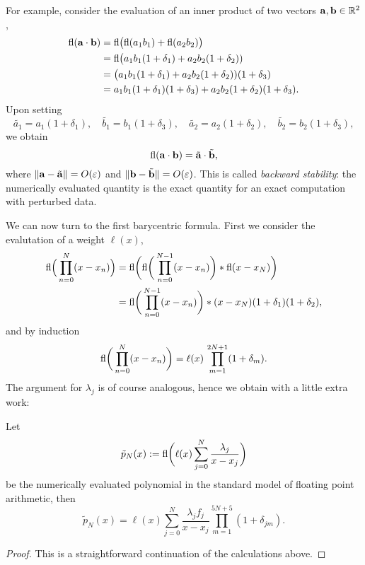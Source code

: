 For example, consider the evaluation of an inner product of two vectors 
${\bf a}, {\bf b} \in \mathbb{R}^2$, 
\begin{align*}
   {\rm fl}({\bf a} \cdot {\bf b})
   &= {\rm fl}\big( {\rm fl}(a_1 b_1) + {\rm fl}(a_2b_2)\big) \\ 
   &= {\rm fl}\big( a_1 b_1 (1+\delta_1) + a_2b_2 (1+\delta_2)) \\ 
   &= \big( a_1 b_1 (1+\delta_1) + a_2b_2 (1+\delta_2))(1+\delta_3) \\ 
   &= a_1 b_1 (1+\delta_1)(1+\delta_3)
      + a_2b_2 (1+\delta_2)(1+\delta_3).
\end{align*}
Upon setting 
\[
   \tilde{a_1} = a_1 (1+\delta_1), \quad 
   \tilde{b_1} = b_1 (1+\delta_3), \quad 
   \tilde{a_2} = a_2 (1+\delta_2), \quad 
   \tilde{b_2} = b_2 (1+\delta_3),
\]
we obtain 
\[
   {\rm fl}({\bf a} \cdot {\bf b}) = \tilde{\bf a} \cdot \tilde{\bf b},
\]
where $\|{\bf a} - \tilde{\bf a}\| = O(\varepsilon)$ and $\|{\bf b} - \tilde{\bf b}\| =
O(\varepsilon)$. This is called {\em backward stability}: the numerically evaluated
quantity is the exact quantity for an exact computation with perturbed data. 


We can now turn to the first barycentric formula. First we consider the 
evalutation of a weight $\ell(x)$, 
\begin{align}
   {\rm fl}\Big( \prod_{n=0}^N (x-x_n) \Big) 
   &= 
   {\rm fl}\bigg( {\rm fl}\bigg( \prod_{n=0}^{N-1} (x-x_n)\bigg) * {\rm fl}(x-x_N) \bigg)  \\ 
   &= 
   {\rm fl}\bigg( \prod_{n=0}^{N-1} (x-x_n)\bigg) * (x-x_N) (1+\delta_{1}) (1+\delta_{2}),
\end{align}
and by induction 
\begin{align}
   {\rm fl}\bigg( \prod_{n=0}^N (x-x_n) \bigg) = 
   \ell(x) \, \prod_{m = 1}^{2N+1} (1+\delta_m). 
\end{align}
The argument for $\lambda_j$ is of course analogous, hence we obtain
with a little extra work:

\begin{proposition} \label{th:poly:barystab}
   Let 
   \[
      \tilde{p}_N(x) := {\rm fl}\bigg( \ell(x) \sum_{j = 0}^N \frac{\lambda_j}{x - x_j} \bigg)
   \]
   be the numerically evaluated polynomial in the standard model of 
   floating point arithmetic, then 
   \[
      \tilde{p}_N(x) = 
      \ell(x) \sum_{j = 0}^N \frac{\lambda_j f_j}{x - x_j}
      \prod_{m = 1}^{5N+5} (1+\delta_{jm}).
   \]
\end{proposition}
\begin{proof}
   This is a straightforward continuation of the calculations above. 
\end{proof}

